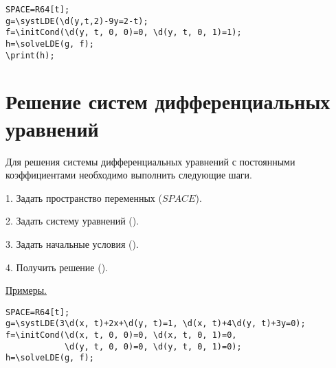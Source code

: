 \begin{verbatim}
SPACE=R64[t]; 
g=\systLDE(\d(y,t,2)-9y=2-t);
f=\initCond(\d(y, t, 0, 0)=0, \d(y, t, 0, 1)=1);
h=\solveLDE(g, f);
\print(h);
\end{verbatim}


\section{Решение систем дифференциальных уравнений}

Для решения системы дифференциальных уравнений с постоянными коэффициентами необходимо выполнить следующие шаги. 

1. Задать пространство переменных ($SPACE$). 

2. Задать систему уравнений (). 

3. Задать начальные условия (). 

4. Получить решение ().

\underline{Примеры. }

\vspace*{-2mm}
\begin{verbatim}
SPACE=R64[t];
g=\systLDE(3\d(x, t)+2x+\d(y, t)=1, \d(x, t)+4\d(y, t)+3y=0);
f=\initCond(\d(x, t, 0, 0)=0, \d(x, t, 0, 1)=0, 
            \d(y, t, 0, 0)=0, \d(y, t, 0, 1)=0);
h=\solveLDE(g, f);  
\end{verbatim}

